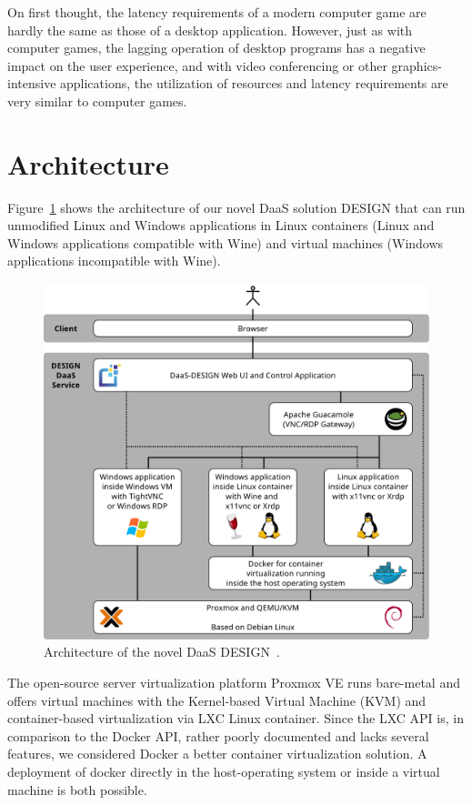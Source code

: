 \documentclass[runningheads]{llncs}
\begin{document}
On first thought, the latency requirements of a modern computer game are hardly the same as those of a desktop application. However, just as with computer games, the lagging operation of desktop programs has a negative impact on the user experience, and with video conferencing or other graphics-intensive applications, the utilization of resources and latency requirements are very similar to computer games.

\section{Architecture}
\label{sec:RecommendDaaSarchitecture}
% 

Figure~\ref{figure_architecture} shows the architecture of our novel DaaS solution DESIGN that can run unmodified Linux and Windows applications in Linux containers (Linux and Windows applications compatible with Wine) and virtual machines (Windows applications incompatible with Wine).


\begin{figure}
	\centering
	\includegraphics[width=.75\linewidth]{images/DaaS_DESIGN_Architecture_v12_english.pdf}
	\caption{Architecture of the novel DaaS DESIGN~\cite{OJCC_2023v8i1n01_Baun}.} 
	\label{figure_architecture}
\end{figure}

The open-source server virtualization platform Proxmox VE runs bare-metal and offers virtual machines with the Kernel-based Virtual Machine (KVM) and container-based virtualization via LXC Linux container. Since the LXC API is, in comparison to the Docker API, rather poorly documented and lacks several features, we considered Docker a better container virtualization solution. A deployment of docker directly in the host-operating system or inside a virtual machine is both possible.
\end{document}

